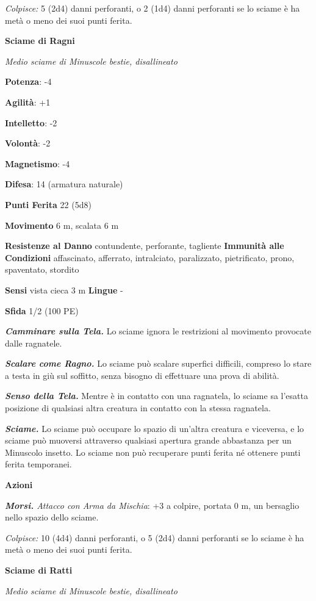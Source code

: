 \begin{multicols}{2}
\emph{Colpisce:} 5 (2d4) danni perforanti, o 2 (1d4) danni perforanti se
lo sciame è ha metà o meno dei suoi punti ferita.

\textbf{Sciame di Ragni}

\emph{Medio sciame di Minuscole bestie, disallineato}

\textbf{Potenza}: -4

\textbf{Agilità}: +1

\textbf{Intelletto}: -2

\textbf{Volontà}: -2

\textbf{Magnetismo}: -4

\textbf{Difesa}: 14 (armatura naturale)

\textbf{Punti Ferita} 22 (5d8)

\textbf{Movimento} 6 m, scalata 6 m

\textbf{Resistenze al Danno} contundente, perforante, tagliente
\textbf{Immunità alle Condizioni} affascinato, afferrato, intralciato,
paralizzato, pietrificato, prono, spaventato, stordito

\textbf{Sensi} vista cieca 3 m \textbf{Lingue} -

\textbf{Sfida} 1/2 (100 PE)

\emph{\textbf{Camminare sulla Tela.}} Lo sciame ignora le restrizioni al
movimento provocate dalle ragnatele.

\emph{\textbf{Scalare come Ragno.}} Lo sciame può scalare superfici
difficili, compreso lo stare a testa in giù sul soffitto, senza bisogno
di effettuare una prova di abilità.

\emph{\textbf{Senso della Tela.}} Mentre è in contatto con una
ragnatela, lo sciame sa l'esatta posizione di qualsiasi altra creatura
in contatto con la stessa ragnatela.

\emph{\textbf{Sciame.}} Lo sciame può occupare lo spazio di un'altra
creatura e viceversa, e lo sciame può muoversi attraverso qualsiasi
apertura grande abbastanza per un Minuscolo insetto. Lo sciame non può
recuperare punti ferita né ottenere punti ferita temporanei.

\textbf{Azioni}

\emph{\textbf{Morsi.} Attacco con Arma da Mischia}: +3 a colpire,
portata 0 m, un bersaglio nello spazio dello sciame.

\emph{Colpisce:} 10 (4d4) danni perforanti, o 5 (2d4) danni perforanti
se lo sciame è ha metà o meno dei suoi punti ferita.

\textbf{Sciame di Ratti}

\emph{Medio sciame di Minuscole bestie, disallineato}


\end{multicols}
